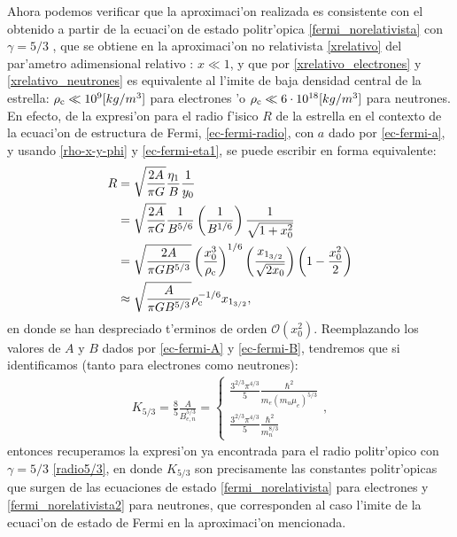 Ahora podemos verificar que la aproximaci'on realizada es consistente con el obtenido a partir de la ecuaci'on de estado politr'opica \eqref{fermi_norelativista} con $\gamma=5/3$ , que se obtiene en la aproximaci'on no relativista \eqref{xrelativo} del par'ametro adimensional relativo : $x\ll1$, y que por \eqref{xrelativo_electrones} y  \eqref{xrelativo_neutrones} es equivalente al l'imite de baja densidad central de la estrella: $\rho_{\rm c}\ll10^{9}[kg/m^3]$ para electrones 'o $\rho_{\rm c}\ll6\cdot10^{18}[kg/m^3]$ para neutrones. En efecto, de la expresi'on para el radio f'isico $R$ de la estrella en el contexto de la ecuaci'on de estructura de Fermi, \eqref{ec-fermi-radio}, con $a$ dado por \eqref{ec-fermi-a}, y usando \eqref{rho-x-y-phi} y \eqref{ec-fermi-eta1}, se puede escribir en forma equivalente:
\begin{align}
 R&=\sqrt{\frac{2A}{\pi G}}\frac{\eta_1}{B}\frac{1}{y_0}\\
&=\sqrt{\frac{2A}{\pi G} }\frac{1}{B^{5/6}}\left(\frac{1}{B^{1/6}}\right)\frac{1}{\sqrt{1+x_0^2}}\\
&=\sqrt{\frac{2A}{\pi G B^{5/3}}}\left(\frac{x_0^3}{\rho_{\rm c}}\right)^{1/6}\left(\frac{x_{1_{3/2}}}{\sqrt{2x_0}}\right)\left(1-\frac{x_0^2}{2}\right)\\
&\approx\sqrt{\frac{A}{\pi G B^{5/3}}}\rho_{\rm c}^{-1/6}x_{1_{3/2}},
\end{align}
en donde se han despreciado t'erminos de orden $\mathcal{O}(x_0^2)$. Reemplazando los valores  de $A$ y $B$ dados por \eqref{ec-fermi-A} y \eqref{ec-fermi-B}, tendremos que si identificamos (tanto para electrones como neutrones):
\begin{align}
 K_{5/3}=\frac{8}{5}\frac{A}{B_{e,n}^{5/3}}=
\begin{cases}
 \frac{3^{2/3}\pi^{4/3}}{5}\frac{\hbar^2 }{m_e(m_u\mu_e)^{5/3}}\\
\frac{3^{2/3}\pi^{4/3}}{5}\frac{\hbar^2 }{m_n^{8/3}}
\end{cases},
\end{align}
entonces recuperamos la expresi'on ya encontrada para el radio politr'opico con $\gamma=5/3$ \eqref{radio5/3}, en donde $K_{5/3}$ son precisamente las constantes politr'opicas que surgen de las ecuaciones de estado \eqref{fermi_norelativista} para electrones y \eqref{fermi_norelativista2} para neutrones, que corresponden al caso l'imite de la ecuaci'on de estado de Fermi en la aproximaci'on mencionada.

